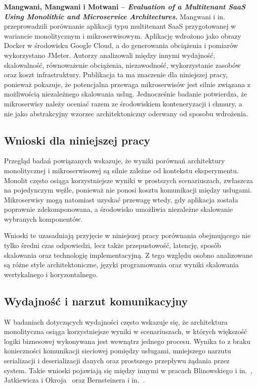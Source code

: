 \medskip

\noindent\textbf{Mangwani, Mangwani i Motwani -- \textit{Evaluation of a Multitenant SaaS Using Monolithic and Microservice Architectures}.}
Mangwani i in.~\cite{mangwani2023evaluation} przeprowadzili porównanie aplikacji typu multitenant SaaS przygotowanej w wariancie monolitycznym i mikroserwisowym. Aplikację wdrożono jako obrazy Docker w środowisku Google Cloud, a do generowania obciążenia i pomiarów wykorzystano JMeter. Autorzy analizowali między innymi wydajność, skalowalność, równoważenie obciążenia, niezawodność, wykorzystanie zasobów oraz koszt infrastruktury. Publikacja ta ma znaczenie dla niniejszej pracy, ponieważ pokazuje, że potencjalna przewaga mikroserwisów jest silnie związana z możliwością niezależnego skalowania usług. Jednocześnie badanie potwierdza, że mikroserwisy należy oceniać razem ze środowiskiem konteneryzacji i chmury, a nie jako abstrakcyjny wzorzec architektoniczny oderwany od sposobu wdrożenia.

\subsection*{Wnioski dla niniejszej pracy}

Przegląd badań powiązanych wskazuje, że wyniki porównań architektury monolitycznej i mikroserwisowej są silnie zależne od kontekstu eksperymentu. Monolit często osiąga korzystniejsze wyniki w prostszych scenariuszach, zwłaszcza na pojedynczym węźle, ponieważ nie ponosi kosztu komunikacji między usługami. Mikroserwisy mogą natomiast uzyskać przewagę wtedy, gdy aplikacja została poprawnie zdekomponowana, a środowisko umożliwia niezależne skalowanie wybranych komponentów.

Wnioski te uzasadniają przyjęcie w niniejszej pracy porównania obejmującego nie tylko średni czas odpowiedzi, lecz także przepustowość, latencję, sposób skalowania oraz technologię implementacyjną. Z tego względu osobno analizowane są różne style architektoniczne, języki programowania oraz wyniki skalowania wertykalnego i horyzontalnego.

\subsection{Wydajność i narzut komunikacyjny}

W badaniach dotyczących wydajności często wskazuje się, że architektura monolityczna osiąga korzystniejsze wyniki w scenariuszach, w których większość logiki biznesowej wykonywana jest wewnątrz jednego procesu. Wynika to z braku konieczności komunikacji sieciowej pomiędzy usługami, mniejszego narzutu serializacji i deserializacji danych oraz prostszego przepływu żądania przez system. Takie wnioski pojawiają się między innymi w pracach Blinowskiego i in.~\cite{blinowski2022monolithic}, Jatkiewicza i Okroja~\cite{okroj2023differences} oraz Bernsteinera i in.~\cite{bernsteiner2025performance}.

